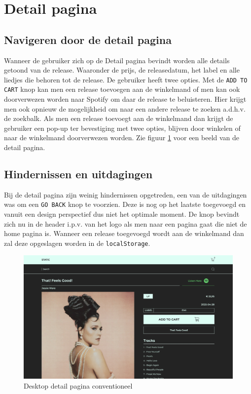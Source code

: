 \newpage

\section{Detail pagina}

\subsection{Navigeren door de detail pagina}

Wanneer de gebruiker zich op de Detail pagina bevindt worden alle details getoond van de release. Waaronder de prijs, de releasedatum, het label en alle liedjes die behoren tot de release. De gebruiker heeft twee opties. Met de \texttt{ADD TO CART} knop kan men een release toevoegen aan de winkelmand of men kan ook doorverwezen worden naar Spotify om daar de release te beluisteren. Hier krijgt men ook opnieuw de mogelijkheid om naar een andere release te zoeken a.d.h.v. de zoekbalk. Als men een release toevoegt aan de winkelmand dan krijgt de gebruiker een pop-up ter bevestiging met twee opties, blijven door winkelen of naar de winkelmand doorverwezen worden. Zie figuur \ref{fig:desktopDetailConventioneel} voor een beeld van de detail pagina.

\subsection{Hindernissen en uitdagingen}

Bij de detail pagina zijn weinig hindernissen opgetreden, een van de uitdagingen was om een \texttt{GO BACK} knop te voorzien. Deze is nog op het laatste toegevoegd en vanuit een design perspectief dus niet het optimale moment. De knop bevindt zich nu in de header i.p.v. van het logo als men naar een pagina gaat die niet de home pagina is. Wanneer een release toegevoegd wordt aan de winkelmand dan zal deze opgeslagen worden in de \texttt{localStorage}.

\begin{figure}[h]
	\centering
	\includegraphics[width=1\linewidth]{graphics/desktopDetailConventioneel}
	\caption[Desktop detail pagina conventioneel]{Desktop detail pagina conventioneel}
	\label{fig:desktopDetailConventioneel}
\end{figure}

